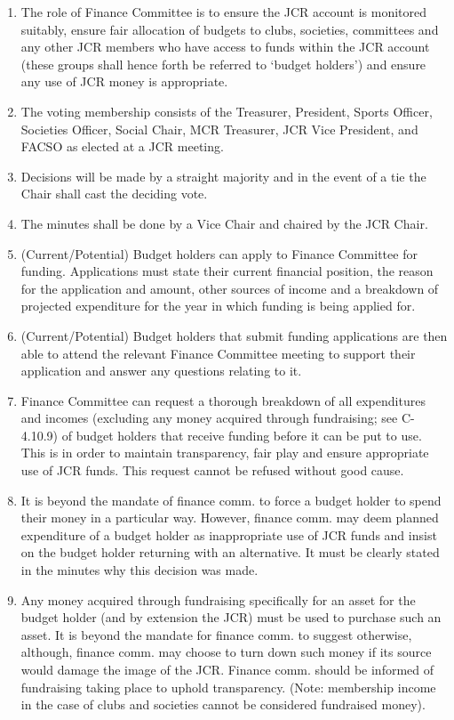 \begin{enumerate}
    \item The role of Finance Committee is to ensure the JCR account is monitored suitably, ensure fair allocation of budgets to clubs, societies, committees and any other JCR members who have access to funds within the JCR account (these groups shall hence forth be referred to ‘budget holders’) and ensure any use of JCR money is appropriate.
    \item The voting membership consists of the Treasurer, President, Sports Officer, Societies Officer, Social Chair, MCR Treasurer, JCR Vice President, and FACSO as elected at a JCR meeting.
    \item Decisions will be made by a straight majority and in the event of a tie the Chair shall cast the deciding vote.
    \item The minutes shall be done by a Vice Chair and chaired by the JCR Chair.
    \item (Current/Potential) Budget holders can apply to Finance Committee for funding. Applications must state their current financial position, the reason for the application and amount, other sources of income and a breakdown of projected expenditure for the year in which funding is being applied for.
    \item (Current/Potential) Budget holders that submit funding applications are then able to attend the relevant Finance Committee meeting to support their application and answer any questions relating to it.
    \item Finance Committee can request a thorough breakdown of all expenditures and incomes (excluding any money acquired through fundraising; see C-4.10.9) of budget holders that receive funding before it can be put to use. This is in order to maintain transparency, fair play and ensure appropriate use of JCR funds. This request cannot be refused without good cause.
    \item It is beyond the mandate of finance comm. to force a budget holder to spend their money in a particular way. However, finance comm. may deem planned expenditure of a budget holder as inappropriate use of JCR funds and insist on the budget holder returning with an alternative. It must be clearly stated in the minutes why this decision was made.
    \item Any money acquired through fundraising specifically for an asset for the budget holder (and by extension the JCR) must be used to purchase such an asset. It is beyond the mandate for finance comm. to suggest otherwise, although, finance comm. may choose to turn down such money if its source would damage the image of the JCR. Finance comm. should be informed of fundraising taking place to uphold transparency. (Note: membership income in the case of clubs and societies cannot be considered fundraised money).

\end{enumerate}

